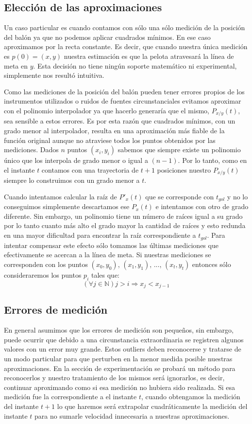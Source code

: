 \subsection{Elección de las aproximaciones}
Un caso particular es cuando contamos con sólo una sólo medición de la posición del balón ya que no podemos aplicar cuadrados mínimos. En
ese caso aproximamos por la recta constante. Es decir, que cuando nuestra única medición es $p(0) = (x, y)$ nuestra estimación es que la 
pelota atravesará la línea de meta en $y$. Esta decisión no tiene ningún soporte matemático ni experimental, simplemente nos resultó
intuitiva.
\par
Como las mediciones de la posición del balón pueden tener errores propios de los instrumentos utilizados o ruidos de fuentes circunstanciales
evitamos aproximar con el polinomio interpolador ya que hacerlo generaría que el mismo, $P_{x/y}(t)$, sea sensible a estos errores. Es por esta
razón que cuadrados mínimos, con un grado menor al interpolador, resulta en una aproximación más fiable de la función original aunque 
no atraviese todos los puntos obtenidos por las mediciones. Dados $n$ puntos $(x_i, y_i)$ sabemos que siempre existe un polinomio único 
que los interpola de grado menor o igual a $(n-1)$. Por lo tanto, como en el instante $t$ contamos con una trayectoria de $t+1$
posiciones nuestro $P_{x/y}(t)$ siempre lo construimos con un grado menor a $t$.
\par
Cuando intentamos calcular la raíz de $P'_x(t)$ que se corresponde con $t_{gol}$ y no lo conseguimos simplemente descartamos ese $P_x(t)$
e intentamos con otro de grado diferente. Sin embargo, un polinomio tiene un número de raíces igual a su grado por lo tanto cuanto más 
alto el grado mayor la cantidad de raíces y esto redunda en una mayor dificultad para encontrar la raíz correspondiente a $t_{gol}$. Para
intentar compensar este efecto sólo tomamos las últimas mediciones que efectivamente se acercan a la línea de meta. Si nuestras mediciones
se corresponden con los puntos $(x_0, y_0)$, $(x_1, y_1)$, ..., $(x_t, y_t)$ entonces sólo consideraremos los puntos $p_i$ tales que:
\begin{displaymath}
 (\forall j \in \mathbb{N}) j > i \Rightarrow x_j < x_{j-1}
\end{displaymath}

\subsection{Errores de medición}
En general asumimos que los errores de medición son pequeños, sin embargo, puede ocurrir que debido a una circunstancia extraordinaria
se registren algunos valores con un error muy grande. Estos outliers deben reconocerse y tratarse de un modo particular para que perturben en
la menor medida posible nuestras aproximaciones. En la sección de experimentación se probará un método para reconocerlos y nuestro 
tratamiento de los mismos será ignorarlos, es decir, continuar aproximando como si esa medición no hubiera sido realizada. Si esa medición
fue la correspondiente a el instante $t$, cuando obtengamos la medición del instante $t+1$ lo que haremos será extrapolar cuadráticamente
la medición del instante $t$ para no sumarle velocidad innecesaria a nuestras aproximaciones.

